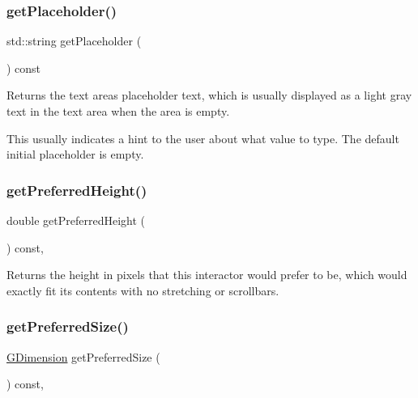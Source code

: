 \subsubsection{\texorpdfstring{get\+Placeholder()}{getPlaceholder()}}
{\footnotesize\ttfamily std\+::string get\+Placeholder (\begin{DoxyParamCaption}{ }\end{DoxyParamCaption}) const\hspace{0.3cm}{\ttfamily [virtual]}}



Returns the text area\textquotesingle{}s placeholder text, which is usually displayed as a light gray text in the text area when the area is empty. 

This usually indicates a hint to the user about what value to type. The default initial placeholder is empty. \mbox{\label{classGInteractor_a747de0961653847bdc6615dbf756d715}} 
\subsubsection{\texorpdfstring{get\+Preferred\+Height()}{getPreferredHeight()}}
{\footnotesize\ttfamily double get\+Preferred\+Height (\begin{DoxyParamCaption}{ }\end{DoxyParamCaption}) const\hspace{0.3cm}{\ttfamily [virtual]}, {\ttfamily [inherited]}}



Returns the height in pixels that this interactor would prefer to be, which would exactly fit its contents with no stretching or scrollbars. 

\mbox{\label{classGInteractor_a4aabbee761d8e9116275401131b7ccd1}} 
\subsubsection{\texorpdfstring{get\+Preferred\+Size()}{getPreferredSize()}}
{\footnotesize\ttfamily \mbox{\hyperlink{classGDimension}{G\+Dimension}} get\+Preferred\+Size (\begin{DoxyParamCaption}{ }\end{DoxyParamCaption}) const\hspace{0.3cm}{\ttfamily [virtual]}, {\ttfamily [inherited]}}



